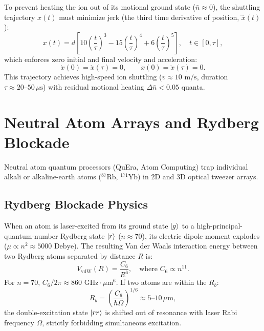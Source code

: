 To prevent heating the ion out of its motional ground state ($\bar{n} \approx 0$), the shuttling trajectory $x(t)$ must minimize jerk (the third time derivative of position, $\dddot{x}(t)$):
\begin{equation}
    x(t) = d \left[ 10\left(\frac{t}{\tau}\right)^3 - 15\left(\frac{t}{\tau}\right)^4 + 6\left(\frac{t}{\tau}\right)^5 \right], \quad t \in [0, \tau],
    \label{eq:minimum_jerk_shuttling_full}
\end{equation}
which enforces zero initial and final velocity and acceleration:
\begin{equation}
    \dot{x}(0) = \dot{x}(\tau) = 0, \qquad \ddot{x}(0) = \ddot{x}(\tau) = 0.
\end{equation}
This trajectory achieves high-speed ion shuttling ($v \approx 10\text{ m/s}$, duration $\tau \approx 20\text{--}50\,\mu\text{s}$) with residual motional heating $\Delta \bar{n} < 0.05$ quanta.


\section{Neutral Atom Arrays and Rydberg Blockade}
\label{sec:neutral_atom_interconnects}

Neutral atom quantum processors (QuEra, Atom Computing) trap individual alkali or alkaline-earth atoms ($^{87}\text{Rb}$, $^{171}\text{Yb}$) in 2D and 3D optical tweezer arrays.

\subsection{Rydberg Blockade Physics}
When an atom is laser-excited from its ground state $\ket{g}$ to a high-principal-quantum-number Rydberg state $\ket{r}$ ($n \approx 70$), its electric dipole moment explodes ($\mu \propto n^2 \approx 5000\text{ Debye}$). The resulting Van der Waals interaction energy between two Rydberg atoms separated by distance $R$ is:
\begin{equation}
    V_{\text{vdW}}(R) = \frac{C_6}{R^6}, \quad \text{where } C_6 \propto n^{11}.
    \label{eq:rydberg_vdw_potential}
\end{equation}
For $n = 70$, $C_6 / 2\pi \approx 860\text{ GHz}\cdot\mu\text{m}^6$. If two atoms are within the  $R_b$:
\begin{equation}
    R_b = \left( \frac{C_6}{\hbar \Omega} \right)^{1/6} \approx 5\text{--}10\,\mu\text{m},
    \label{eq:rydberg_blockade_radius}
\end{equation}
the double-excitation state $\ket{rr}$ is shifted out of resonance with laser Rabi frequency $\Omega$, strictly forbidding simultaneous excitation.

